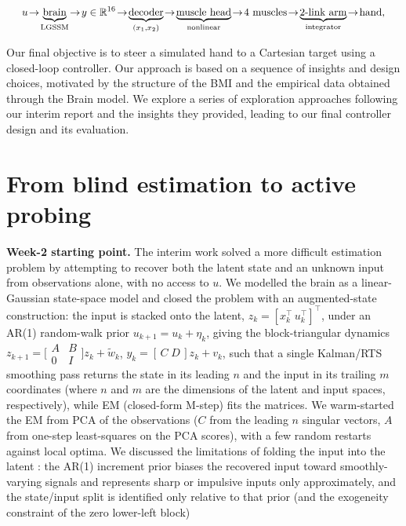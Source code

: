 \documentclass[11pt]{article}
\begin{document}
\[
\resizebox{0.96\linewidth}{!}{$\displaystyle
u \!\to\! \underbrace{\text{brain}}_{\text{LGSSM}} \!\to\! y\in\mathbb{R}^{16}
\!\to\! \underbrace{\text{decoder}}_{(x_1,x_2)} \!\to\! \underbrace{\text{muscle head}}_{\text{nonlinear}}
\!\to\! \text{4 muscles} \!\to\! \underbrace{\text{2-link arm}}_{\text{integrator}} \!\to\! \text{hand},$}
\]

Our final objective is to steer a simulated hand to a Cartesian target using a closed-loop controller. Our approach is based on a sequence of insights and design choices, 
motivated by the structure of the BMI and the empirical data obtained through the Brain model. 
We explore a series of exploration approaches following our interim report and the insights they provided,
leading to our final controller design and its evaluation.

\section{From blind estimation to active probing}
\label{sec:est}
\textbf{Week-2 starting point.} The interim work solved a more difficult estimation problem
by attempting to recover both the latent state and an unknown input from observations alone,
with no access to $u$. We modelled the brain as a linear-Gaussian state-space model and
closed the problem with an augmented-state construction: the input is stacked
onto the latent, $z_k=[x_k^\top\,u_k^\top]^\top$, under an AR(1) random-walk prior
$u_{k+1}=u_k+\eta_k$, giving the block-triangular dynamics
$z_{k+1}=\big[\begin{smallmatrix}A&B\\0&I\end{smallmatrix}\big]z_k+\tilde w_k$,
$y_k=[\,C\;D\,]z_k+v_k$, such that a single Kalman/RTS smoothing pass returns the
state in its leading $n$ and the input in its trailing $m$ coordinates (where $n$ and $m$ 
are the dimensions of the latent and input spaces, respectively), while EM
(closed-form M-step) fits the matrices. We warm-started the EM from PCA
of the observations ($C$ from the leading $n$ singular vectors, $A$ from one-step least-squares on the PCA scores),
with a few random restarts against local optima. We discussed the limitations of folding the input into the latent : the AR(1) increment prior biases the recovered input toward
smoothly-varying signals and represents sharp or impulsive inputs only approximately,
and the state/input split is identified only relative to that prior (and the
exogeneity constraint of the zero lower-left block)
\end{document}
